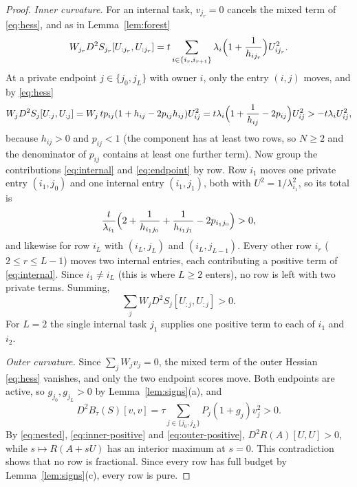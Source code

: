 \documentclass[11pt]{article}
\theoremstyle{plain}
\theoremstyle{definition}
\theoremstyle{remark}
\begin{document}
\begin{proof}
\emph{Inner curvature.} For an internal task, $v_{j_r}=0$ cancels the mixed term of \eqref{eq:hess}, and as in Lemma~\ref{lem:forest}
\begin{equation}\label{eq:internal}
 W_{j_r}D^2S_{j_r}[U_{:j_r},U_{:j_r}]=t\sum_{i\in\{i_r,i_{r+1}\}}\lambda_i\Bigl(1+\frac1{h_{ij_r}}\Bigr)U_{ij_r}^2 .
\end{equation}
At a private endpoint $j\in\{j_0,j_L\}$ with owner $i$, only the entry $(i,j)$ moves, and by \eqref{eq:hess}
\begin{equation}\label{eq:endpoint}
 W_jD^2S_j[U_{:j},U_{:j}]=W_j\,tp_{ij}(1+h_{ij}-2p_{ij}h_{ij})U_{ij}^2=t\lambda_i\Bigl(1+\frac1{h_{ij}}-2p_{ij}\Bigr)U_{ij}^2>-t\lambda_iU_{ij}^2,
\end{equation}
because $h_{ij}>0$ and $p_{ij}<1$ (the component has at least two rows, so $N\ge2$ and the denominator of $p_{ij}$ contains at least one further term). Now group the contributions \eqref{eq:internal} and \eqref{eq:endpoint} by row. Row $i_1$ moves one private entry $(i_1,j_0)$ and one internal entry $(i_1,j_1)$, both with $U^2=1/\lambda_{i_1}^2$, so its total is
\[
 \frac{t}{\lambda_{i_1}}\Bigl(2+\frac1{h_{i_1j_0}}+\frac1{h_{i_1j_1}}-2p_{i_1j_0}\Bigr)>0,
\]
and likewise for row $i_L$ with $(i_L,j_L)$ and $(i_L,j_{L-1})$. Every other row $i_r$ ($2\le r\le L-1$) moves two internal entries, each contributing a positive term of \eqref{eq:internal}. Since $i_1\ne i_L$ (this is where $L\ge2$ enters), no row is left with two private terms. Summing,
\begin{equation}\label{eq:inner-positive}
 \sum_jW_jD^2S_j[U_{:j},U_{:j}]>0 .
\end{equation}
For $L=2$ the single internal task $j_1$ supplies one positive term to each of $i_1$ and $i_2$.

\emph{Outer curvature.} Since $\sum_jW_jv_j=0$, the mixed term of the outer Hessian \eqref{eq:hess} vanishes, and only the two endpoint scores move. Both endpoints are active, so $g_{j_0},g_{j_L}>0$ by Lemma~\ref{lem:signs}(a), and
\begin{equation}\label{eq:outer-positive}
 D^2B_\tau(S)[v,v]=\tau\sum_{j\in\{j_0,j_L\}}P_j(1+g_j)v_j^2>0 .
\end{equation}
By \eqref{eq:nested}, \eqref{eq:inner-positive} and \eqref{eq:outer-positive}, $D^2R(A)[U,U]>0$, while $s\mapsto R(A+sU)$ has an interior maximum at $s=0$. This contradiction shows that no row is fractional. Since every row has full budget by Lemma~\ref{lem:signs}(c), every row is pure.
\end{proof}
\end{document}

